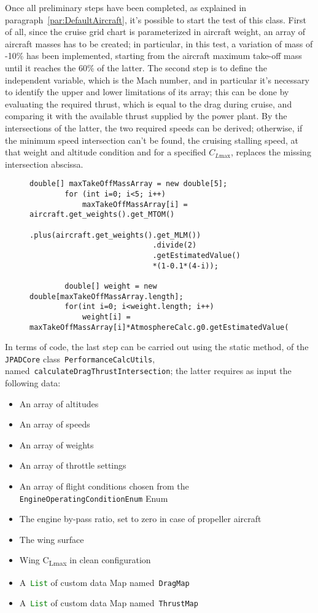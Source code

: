 \bigskip
\noindent
Once all preliminary steps have been completed, as explained in paragraph~\ref{par:DefaultAircraft}, it's possible to start the test of this class. 
%
First of all, since the cruise grid chart is parameterized in aircraft weight, an array of aircraft masses has to be created; in particular, in this test, a variation of mass of -10\% has been implemented, starting from the aircraft maximum take-off mass until it reaches the 60\% of the latter. 
%
The second step is to define the independent variable, which is the Mach number, and in particular it's necessary to identify the upper and lower limitations of its array; this can be done by evaluating the required thrust, which is equal to the drag during cruise, and comparing it with the available thrust supplied by the power plant.
%
\noindent
By the intersections of the latter, the two required speeds can be derived; otherwise, if the minimum speed intersection can't be found, the cruising stalling speed, at that weight and altitude condition and for a specified $C_{L\text{max}}$, replaces the missing intersection abscissa.
%
\begin{figure}[t]
\begin{lstlisting}[caption={Mass variation in Specific Range test - B747-100B}, captionpos=b, tabsize=2]
		double[] maxTakeOffMassArray = new double[5];
		for (int i=0; i<5; i++)
			maxTakeOffMassArray[i] =	aircraft.get_weights().get_MTOM()
							.plus(aircraft.get_weights().get_MLM())
							.divide(2)
							.getEstimatedValue()
							*(1-0.1*(4-i));

		double[] weight = new double[maxTakeOffMassArray.length];
		for(int i=0; i<weight.length; i++)
			weight[i] = maxTakeOffMassArray[i]*AtmosphereCalc.g0.getEstimatedValue();
\end{lstlisting}
\end{figure}
%
In terms of code, the last step can be carried out using the static method, of the \lstinline[language=Java]!JPADCore! class~\lstinline[language=Java]!PerformanceCalcUtils!, named~\lstinline[language=Java]!calculateDragThrustIntersection!; the latter requires as input the following data:
%
\begin{itemize}
\item An array of altitudes
\item An array of speeds
\item An array of weights
\item An array of throttle settings
\item An array of flight conditions chosen from the \lstinline[language=Java]!EngineOperatingConditionEnum! \gls{Enum}
\item The engine by-pass ratio, set to zero in case of propeller aircraft
\item The wing surface
\item Wing C\textsubscript{Lmax} in clean configuration
\item A~\lstinline[language=Java]!List! of custom data \gls{Map} named~\lstinline[language=Java]!DragMap!
\item A~\lstinline[language=Java]!List! of custom data \gls{Map} named~\lstinline[language=Java]!ThrustMap!
\end{itemize}

